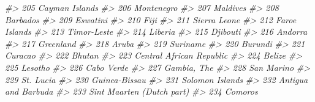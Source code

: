\documentclass[
  xelatex, ja=standard]{bxjsbook}
\newenvironment{Shaded}{\begin{snugshade}}{\end{snugshade}}
\newcommand{\CommentTok}[1]{\textcolor[rgb]{0.56,0.35,0.01}{\textit{#1}}}
\theoremstyle{definition}
\theoremstyle{definition}
\theoremstyle{definition}
\theoremstyle{definition}
\theoremstyle{remark}
\begin{document}
\begin{Shaded}
\begin{Highlighting}[]
\CommentTok{\#\textgreater{} 205                                       Cayman Islands}
\CommentTok{\#\textgreater{} 206                                           Montenegro}
\CommentTok{\#\textgreater{} 207                                             Maldives}
\CommentTok{\#\textgreater{} 208                                             Barbados}
\CommentTok{\#\textgreater{} 209                                             Eswatini}
\CommentTok{\#\textgreater{} 210                                                 Fiji}
\CommentTok{\#\textgreater{} 211                                         Sierra Leone}
\CommentTok{\#\textgreater{} 212                                        Faroe Islands}
\CommentTok{\#\textgreater{} 213                                          Timor{-}Leste}
\CommentTok{\#\textgreater{} 214                                              Liberia}
\CommentTok{\#\textgreater{} 215                                             Djibouti}
\CommentTok{\#\textgreater{} 216                                              Andorra}
\CommentTok{\#\textgreater{} 217                                            Greenland}
\CommentTok{\#\textgreater{} 218                                                Aruba}
\CommentTok{\#\textgreater{} 219                                             Suriname}
\CommentTok{\#\textgreater{} 220                                              Burundi}
\CommentTok{\#\textgreater{} 221                                              Curacao}
\CommentTok{\#\textgreater{} 222                                               Bhutan}
\CommentTok{\#\textgreater{} 223                             Central African Republic}
\CommentTok{\#\textgreater{} 224                                               Belize}
\CommentTok{\#\textgreater{} 225                                              Lesotho}
\CommentTok{\#\textgreater{} 226                                           Cabo Verde}
\CommentTok{\#\textgreater{} 227                                          Gambia, The}
\CommentTok{\#\textgreater{} 228                                           San Marino}
\CommentTok{\#\textgreater{} 229                                            St. Lucia}
\CommentTok{\#\textgreater{} 230                                        Guinea{-}Bissau}
\CommentTok{\#\textgreater{} 231                                      Solomon Islands}
\CommentTok{\#\textgreater{} 232                                  Antigua and Barbuda}
\CommentTok{\#\textgreater{} 233                            Sint Maarten (Dutch part)}
\CommentTok{\#\textgreater{} 234                                              Comoros}

\end{Highlighting}
\end{Shaded}
\end{document}
